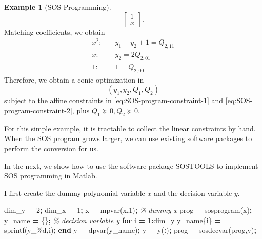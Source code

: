 \documentclass[
]{book}
\newenvironment{Shaded}{\begin{snugshade}}{\end{snugshade}}
\newcommand{\CommentTok}[1]{\textcolor[rgb]{0.56,0.35,0.01}{\textit{#1}}}
\newcommand{\FloatTok}[1]{\textcolor[rgb]{0.00,0.00,0.81}{#1}}
\newcommand{\KeywordTok}[1]{\textcolor[rgb]{0.13,0.29,0.53}{\textbf{#1}}}
\newcommand{\NormalTok}[1]{#1}
\newcommand{\OperatorTok}[1]{\textcolor[rgb]{0.81,0.36,0.00}{\textbf{#1}}}
\newcommand{\SpecialStringTok}[1]{\textcolor[rgb]{0.31,0.60,0.02}{#1}}
\newcommand{\VariableTok}[1]{\textcolor[rgb]{0.00,0.00,0.00}{#1}}
\theoremstyle{definition}
\theoremstyle{definition}
\newtheorem{example}{Example}[chapter]
\theoremstyle{definition}
\theoremstyle{definition}
\theoremstyle{remark}
\begin{document}
\begin{example}[SOS Programming]
\[\begin{bmatrix} 1 \\ x \end{bmatrix}.
\]
Matching coefficients, we obtain
\begin{equation}
\begin{split}
x^2: & \quad y_1 - y_2 + 1 = Q_{2,11} \\
x: & \quad y_2 = 2 Q_{2,01} \\
1: & \quad 1 = Q_{2,00}
\end{split}
\label{eq:SOS-program-constraint-2}
\end{equation}
Therefore, we obtain a conic optimization in
\[
(y_1,y_2,Q_1,Q_2)
\]
subject to the affine constraints in \eqref{eq:SOS-program-constraint-1} and \eqref{eq:SOS-program-constraint-2}, plus \(Q_1 \succeq 0, Q_2 \succeq 0\).

For this simple example, it is tractable to collect the linear constraints by hand. When the SOS program grows larger, we can use existing software packages to perform the conversion for us.

In the next, we show how to use the software package SOSTOOLS \citep{prajna02cdc-sostools} to implement SOS programming in Matlab.

I first create the dummy polynomial variable \(x\) and the decision variable \(y\).

\begin{Shaded}
\begin{Highlighting}[]
\VariableTok{dim\_y} \OperatorTok{=} \FloatTok{2}\OperatorTok{;}
\VariableTok{dim\_x} \OperatorTok{=} \FloatTok{1}\OperatorTok{;}
\VariableTok{x} \OperatorTok{=} \VariableTok{mpvar}\NormalTok{(}\SpecialStringTok{\textquotesingle{}x\textquotesingle{}}\OperatorTok{,}\FloatTok{1}\NormalTok{)}\OperatorTok{;} \CommentTok{\% dummy x }
\VariableTok{prog} \OperatorTok{=} \VariableTok{sosprogram}\NormalTok{(}\VariableTok{x}\NormalTok{)}\OperatorTok{;}
\VariableTok{y\_name} \OperatorTok{=}\NormalTok{ \{\}}\OperatorTok{;} \CommentTok{\% decision variable y}
\KeywordTok{for} \VariableTok{i} \OperatorTok{=} \FloatTok{1}\OperatorTok{:}\VariableTok{dim\_y}
    \VariableTok{y\_name}\NormalTok{\{}\VariableTok{i}\NormalTok{\} }\OperatorTok{=} \VariableTok{sprintf}\NormalTok{(}\SpecialStringTok{\textquotesingle{}y\_\%d\textquotesingle{}}\OperatorTok{,}\VariableTok{i}\NormalTok{)}\OperatorTok{;}
\KeywordTok{end}
\VariableTok{y} \OperatorTok{=} \VariableTok{dpvar}\NormalTok{(}\VariableTok{y\_name}\NormalTok{)}\OperatorTok{;}
\VariableTok{y} \OperatorTok{=} \VariableTok{y}\NormalTok{(}\OperatorTok{:}\NormalTok{)}\OperatorTok{;}
\VariableTok{prog} \OperatorTok{=} \VariableTok{sosdecvar}\NormalTok{(}\VariableTok{prog}\OperatorTok{,}\VariableTok{y}\NormalTok{)}\OperatorTok{;}
\end{Highlighting}
\end{Shaded}


\end{example}
\end{document}
